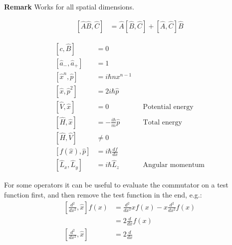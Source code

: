 \textbf{Remark} Works for all spatial dimensions.

\newpar{}

\noindent\begin{align*}
    \left[\widehat{A}\widehat{B},\widehat{C}\right] & =\widehat{A}\left[\widehat{B},\widehat{C}\right]+\left[\widehat{A},\widehat{C}\right]\widehat{B}
\end{align*}



\noindent\begin{align*}
    \left[c,\hat B\right]                        & =0                                                         \\
    \left[\widehat{a}_{-},\widehat{a}_{+}\right] & = 1                                                        \\
    \left[\widehat{x}^n,\widehat{p}\right]       & = i \hbar n x^{n-1}                                        \\
    \left[\widehat{x},\widehat{p}^2\right]       & = 2i\hbar\widehat{p}                                       \\
    \left[\widehat{V},\widehat{x}\right]         & =0                            &  & \text{Potential energy} \\
    \left[\widehat{H},\widehat{x}\right]         & =-\frac{i\hbar}{m}\widehat{p} &  & \text{Total energy}     \\
    \left[\widehat{H}, \widehat{V}\right]        & \neq 0                                                     \\
    \left[f(\widehat{x}),\widehat{p}\right]      & = i \hbar\frac{df}{dx}                                     \\
    \left[\widehat{L}_x,\widehat{L}_y\right]     & =i\hbar\widehat{L}_z          &  & \text{Angular momentum}
\end{align*}



For some operators it can be useful to evaluate the commutator on a test function first, and then remove the test function in the end, e.g.:
\noindent\begin{align*}
    \left[\frac{d^2}{dx^2}, \widehat{x}\right] f(x) & = \frac{d^2}{dx^2} xf(x) - x\frac{d^2}{dx^2}f(x) \\
                                                    & = 2\frac{d}{dx} f(x)                             \\
    \left[\frac{d^2}{dx^2}, \widehat{x}\right]      & = 2\frac{d}{dx}
\end{align*}

